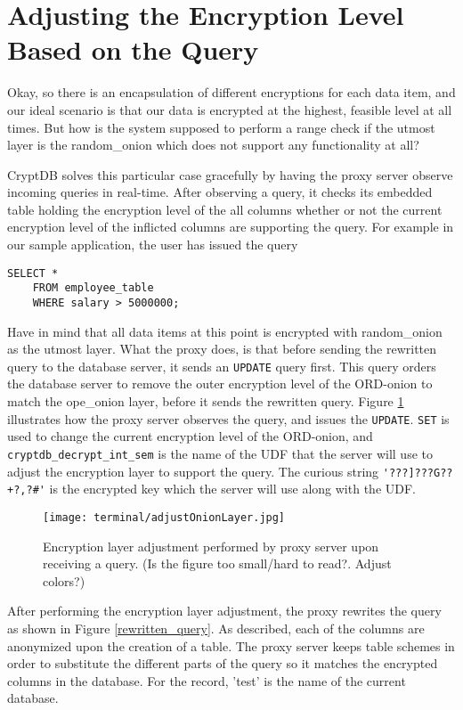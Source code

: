 \section{Adjusting the Encryption Level Based on the Query}
\label{adjust_enc_level}

Okay, so there is an encapsulation of different encryptions for each data item, and our ideal scenario is that our data is encrypted at the highest, feasible level at all times.  But how is the system supposed to perform a range check if the utmost layer is the \gls{random_onion} which does not support any functionality at all?

CryptDB solves this particular case gracefully by having the proxy server observe incoming queries in real-time. After observing a query, it checks its embedded table holding the encryption level of the all columns whether or not the current encryption level of the inflicted columns are supporting the query. For example in our sample application, the user has issued the query 
\begin{verbatim}
SELECT *
	FROM employee_table
	WHERE salary > 5000000;
\end{verbatim}

Have in mind that all data items at this point is encrypted with \gls{random_onion} as the utmost layer. What the proxy does, is that before sending the rewritten query to the database server, it sends an \verb!UPDATE! query first. This query orders the database server to remove the outer encryption level of the ORD-onion to match the \gls{ope_onion} layer, before it sends the rewritten query. Figure \ref{ope_layer_adjustment} illustrates how the proxy server observes the query, and issues the \verb!UPDATE!. \verb!SET! is used to change the current encryption level of the ORD-onion, and \verb!cryptdb_decrypt_int_sem! is the name of the UDF that the server will use to adjust the encryption layer to  support the query. The curious string \verb!'???]???G??+?,?#'! is the encrypted key which the server will use along with the UDF.

\begin{figure}[h]
	\texttt{[image: terminal/adjustOnionLayer.jpg]}
	\caption{Encryption layer adjustment performed by proxy server upon receiving a query. (Is the figure too small/hard to read?. Adjust colors?)}
	\label{ope_layer_adjustment}
\end{figure}

\newpage
After performing the encryption layer adjustment, the proxy rewrites the query as shown in Figure \ref{rewritten_query}. As described, each of the columns are anonymized upon the creation of a table. The proxy server keeps table schemes in order to substitute the different parts of the query so it matches the encrypted columns in the database. For the record, 'test' is the name of the current database.  

